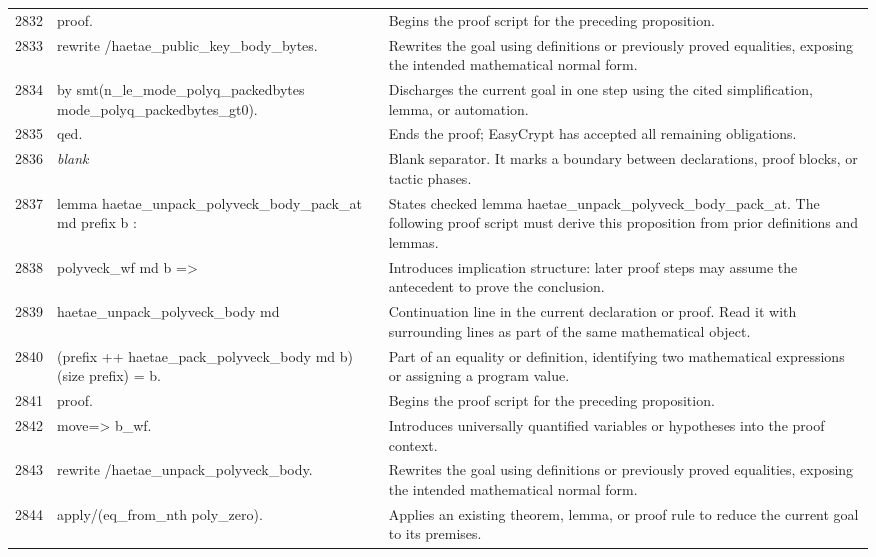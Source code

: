 \documentclass[10pt]{article}
\begin{document}
\begin{longtable}{r L{0.53\textwidth} L{0.37\textwidth}}
2832 & {\ttfamily\scriptsize proof.} & Begins the proof script for the preceding proposition. \\
2833 & {\ttfamily\scriptsize rewrite /haetae\_public\_key\_body\_bytes.} & Rewrites the goal using definitions or previously proved equalities, exposing the intended mathematical normal form. \\
2834 & {\ttfamily\scriptsize by smt(n\_le\_mode\_polyq\_packedbytes mode\_polyq\_packedbytes\_gt0).} & Discharges the current goal in one step using the cited simplification, lemma, or automation. \\
2835 & {\ttfamily\scriptsize qed.} & Ends the proof; EasyCrypt has accepted all remaining obligations. \\
2836 & {\ttfamily\scriptsize \emph{blank}} & Blank separator.  It marks a boundary between declarations, proof blocks, or tactic phases. \\
2837 & {\ttfamily\scriptsize lemma haetae\_unpack\_polyveck\_body\_pack\_at md prefix b :} & States checked lemma haetae\_unpack\_polyveck\_body\_pack\_at.  The following proof script must derive this proposition from prior definitions and lemmas. \\
2838 & {\ttfamily\scriptsize   polyveck\_wf md b =>} & Introduces implication structure: later proof steps may assume the antecedent to prove the conclusion. \\
2839 & {\ttfamily\scriptsize   haetae\_unpack\_polyveck\_body md} & Continuation line in the current declaration or proof.  Read it with surrounding lines as part of the same mathematical object. \\
2840 & {\ttfamily\scriptsize     (prefix ++ haetae\_pack\_polyveck\_body md b) (size prefix) = b.} & Part of an equality or definition, identifying two mathematical expressions or assigning a program value. \\
2841 & {\ttfamily\scriptsize proof.} & Begins the proof script for the preceding proposition. \\
2842 & {\ttfamily\scriptsize move=> b\_wf.} & Introduces universally quantified variables or hypotheses into the proof context. \\
2843 & {\ttfamily\scriptsize rewrite /haetae\_unpack\_polyveck\_body.} & Rewrites the goal using definitions or previously proved equalities, exposing the intended mathematical normal form. \\
2844 & {\ttfamily\scriptsize apply/(eq\_from\_nth poly\_zero).} & Applies an existing theorem, lemma, or proof rule to reduce the current goal to its premises. \\

\end{longtable}
\end{document}
